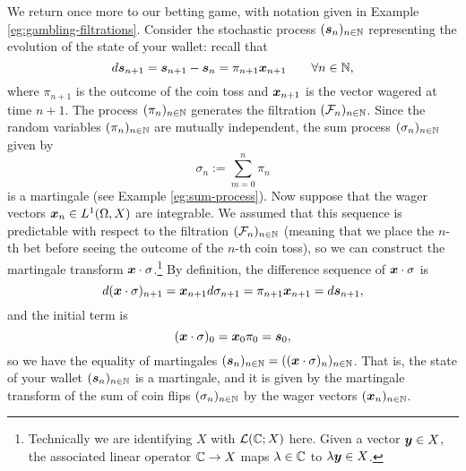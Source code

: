 \begin{example}\label{eg:betting-game-martingale}
  We return once more to our betting game, with notation given in Example \ref{eg:gambling-filtrations}.
  Consider the stochastic process $(\bm{s}_n)_{n \in \mathbb{N}}$ representing the evolution of the state of your wallet: recall that
  \begin{equation*}
    d\bm{s}_{n+1} = \bm{s}_{n+1} - \bm{s}_{n} = \pi_{n+1} \bm{x}_{n+1} \qquad \forall n \in \mathbb{N},
  \end{equation*}
  where $\pi_{n+1}$ is the outcome of the coin toss and $\bm{x}_{n+1}$ is the vector wagered at time $n+1$.
  The process $(\pi_n)_{n \in \mathbb{N}}$ generates the filtration $(\mathcal{F}_n)_{n \in \mathbb{N}}$.
  Since the random variables $(\pi_n)_{n \in \mathbb{N}}$ are mutually independent, the sum process $(\sigma_{n})_{n \in \mathbb{N}}$ given by
  \begin{equation*}
    \sigma_{n} := \sum_{m=0}^n \pi_{n}
  \end{equation*}
  is a martingale (see Example \ref{eg:sum-process}).
  Now suppose that the wager vectors $\bm{x}_n \in L^1(\Omega,X)$ are integrable.
  We assumed that this sequence is predictable with respect to the filtration $(\mathcal{F}_{n})_{n \in \mathbb{N}}$ (meaning that we place the $n$-th bet before seeing the outcome of the $n$-th coin toss), so we can construct the martingale transform $\bm{x} \cdot \sigma$.\footnote{Technically we are identifying $X$ with $\mathcal{L}(\mathbb{C};X)$ here. Given a vector $\bm{y} \in X$, the associated linear operator $\mathbb{C} \to X$ maps $\lambda \in \mathbb{C}$ to $\lambda \bm{y} \in X$.}
  By definition, the difference sequence of $\bm{x} \cdot \sigma$ is
  \begin{equation*}
    d(\bm{x} \cdot \sigma)_{n+1} = \bm{x}_{n+1} d\sigma_{n+1} = \pi_{n+1} \bm{x}_{n+1} = d\bm{s}_{n+1}, 
  \end{equation*}
  and the initial term is
  \begin{equation*}
    (\bm{x} \cdot \sigma)_0 = \bm{x}_{0} \pi_{0} = \bm{s}_{0},
  \end{equation*}
  so we have the equality of martingales $(\bm{s}_{n})_{n \in \mathbb{N}} = ((\bm{x} \cdot \sigma)_{n})_{n \in \mathbb{N}}$.
  That is, the state of your wallet $(\bm{s}_{n})_{n \in \mathbb{N}}$ is a martingale, and it is given by the martingale transform of the sum of coin flips $(\sigma_{n})_{n \in \mathbb{N}}$ by the wager vectors $(\bm{x}_{n})_{n \in \mathbb{N}}$.
\end{example}





